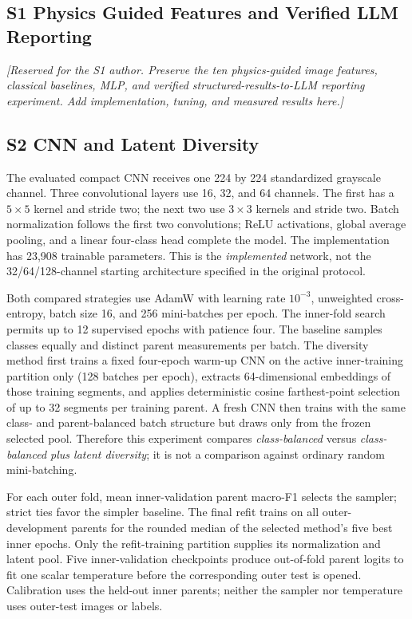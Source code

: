 \IfFileExists{IEEEtran.cls}{\ieeetrue\documentclass[conference]{IEEEtran}}{\ieeefalse\documentclass[10pt,twocolumn,letterpaper]{article}}
\begin{document}
\subsection{S1 Physics Guided Features and Verified LLM Reporting}
\textit{[Reserved for the S1 author. Preserve the ten physics-guided image features, classical baselines, MLP, and verified structured-results-to-LLM reporting experiment. Add implementation, tuning, and measured results here.]}

\subsection{S2 CNN and Latent Diversity}
The evaluated compact CNN receives one 224 by 224 standardized grayscale channel. Three convolutional layers use 16, 32, and 64 channels. The first has a $5\times5$ kernel and stride two; the next two use $3\times3$ kernels and stride two. Batch normalization follows the first two convolutions; ReLU activations, global average pooling, and a linear four-class head complete the model. The implementation has 23,908 trainable parameters. This is the \emph{implemented} network, not the 32/64/128-channel starting architecture specified in the original protocol.

Both compared strategies use AdamW with learning rate $10^{-3}$, unweighted cross-entropy, batch size 16, and 256 mini-batches per epoch. The inner-fold search permits up to 12 supervised epochs with patience four. The baseline samples classes equally and distinct parent measurements per batch. The diversity method first trains a fixed four-epoch warm-up CNN on the active inner-training partition only (128 batches per epoch), extracts 64-dimensional embeddings of those training segments, and applies deterministic cosine farthest-point selection of up to 32 segments per training parent. A fresh CNN then trains with the same class- and parent-balanced batch structure but draws only from the frozen selected pool. Therefore this experiment compares \emph{class-balanced} versus \emph{class-balanced plus latent diversity}; it is not a comparison against ordinary random mini-batching.

For each outer fold, mean inner-validation parent macro-F1 selects the sampler; strict ties favor the simpler baseline. The final refit trains on all outer-development parents for the rounded median of the selected method's five best inner epochs. Only the refit-training partition supplies its normalization and latent pool. Five inner-validation checkpoints produce out-of-fold parent logits to fit one scalar temperature before the corresponding outer test is opened. Calibration uses the held-out inner parents; neither the sampler nor temperature uses outer-test images or labels.
\end{document}
